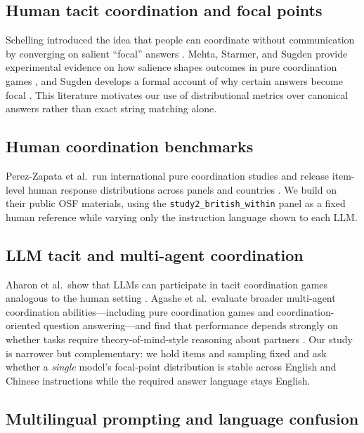 \documentclass[11pt]{article}
\begin{document}
\subsection{Human tacit coordination and focal points}

Schelling introduced the idea that people can coordinate without communication by converging on salient ``focal'' answers \cite{schelling1960}. Mehta, Starmer, and Sugden provide experimental evidence on how salience shapes outcomes in pure coordination games \cite{mehta1994}, and Sugden develops a formal account of why certain answers become focal \cite{sugden1995}. This literature motivates our use of distributional metrics over canonical answers rather than exact string matching alone.

\subsection{Human coordination benchmarks}

Perez-Zapata et al.\ run international pure coordination studies and release item-level human response distributions across panels and countries \cite{perez2026}. We build on their public OSF materials, using the \texttt{study2\_british\_within} panel as a fixed human reference while varying only the instruction language shown to each LLM.

\subsection{LLM tacit and multi-agent coordination}

Aharon et al.\ show that LLMs can participate in tacit coordination games analogous to the human setting \cite{aharon2026}. Agashe et al.\ evaluate broader multi-agent coordination abilities---including pure coordination games and coordination-oriented question answering---and find that performance depends strongly on whether tasks require theory-of-mind-style reasoning about partners \cite{agashe2025coord}. Our study is narrower but complementary: we hold items and sampling fixed and ask whether a \emph{single} model's focal-point distribution is stable across English and Chinese instructions while the required answer language stays English.

\subsection{Multilingual prompting and language confusion}
\end{document}
